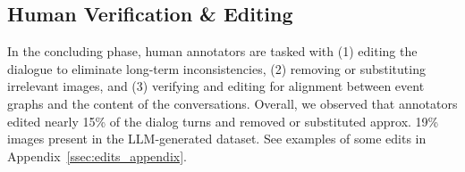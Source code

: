 \subsection{Human Verification \& Editing}
\label{ssec:manual-filter}
In the concluding phase, human annotators are tasked with (1) editing the dialogue to eliminate long-term inconsistencies, (2) removing or substituting irrelevant images, and (3) verifying and editing for alignment between event graphs and the content of the conversations. Overall, we observed that annotators edited nearly 15\% of the dialog turns and removed or substituted approx. 19\% images present in the LLM-generated dataset. See examples of some edits in Appendix~\ref{ssec:edits_appendix}.
